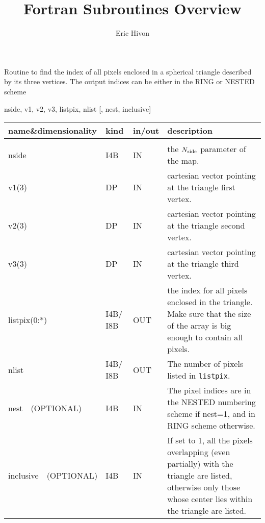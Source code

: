 
\sloppy


\title{\healpix Fortran Subroutines Overview}
 \section[query\_triangle]{ }
\label{sub:query_triangle}
\author{Eric Hivon}

\begin{facility}
{Routine to find the index of all pixels enclosed in a spherical triangle described by its three vertices. The output indices can be either in the RING or NESTED scheme} 
{\modPixTools}
\end{facility}

\begin{f90format}
{nside, v1, v2, v3, listpix, nlist [, nest, inclusive]}
\end{f90format}

\begin{arguments}
{
\begin{tabular}{p{0.28\hsize} p{0.05\hsize} p{0.1\hsize} p{0.47\hsize}} \hline 
\textbf{name\&dimensionality} & \textbf{kind} & \textbf{in/out} & \textbf{description} \\ \hline
                   &   &   &                           \\ %
nside & I4B & IN & the ${N_{\rm side}}$ parameter of the map. \\
v1(3) & DP & IN & cartesian vector pointing at the triangle first vertex. \\
v2(3) & DP & IN & cartesian vector pointing at the triangle second vertex. \\
v3(3) & DP & IN & cartesian vector pointing at the triangle third vertex. \\
listpix(0:*) & I4B/ I8B & OUT & the index for all pixels enclosed in the triangle. Make sure that the size of the array is big enough to contain all pixels. \\ 
nlist & I4B/ I8B & OUT & The number of pixels listed in {\tt listpix}. \\
nest\ \ (OPTIONAL) & I4B & IN &  The pixel indices are in the NESTED numbering scheme if nest=1, and in RING scheme otherwise. \\
inclusive\ \ (OPTIONAL) & I4B & IN & If set to 1, all the pixels overlapping
                   (even partially)
                   with the triangle are listed, otherwise only those whose
                   center lies within the triangle are listed. \\
\end{tabular}
}
\end{arguments}

